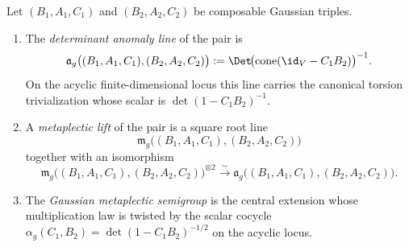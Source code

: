 \begin{definition}
\label{def:frontier-determinant-anomaly-line}
Let $(B_1,A_1,C_1)$ and $(B_2,A_2,C_2)$ be composable Gaussian triples.
\begin{enumerate}[label=\textup{(\roman*)}]
\item The \emph{determinant anomaly line} of the pair is
 \begin{equation}\label{eq:frontier-determinant-anomaly-line}
 \mathfrak a_g\bigl((B_1,A_1,C_1),(B_2,A_2,C_2)\bigr)
 :=
 \Det\!\bigl(\operatorname{cone}(\id_V-C_1B_2)\bigr)^{-1}.
 \end{equation}
 On the acyclic finite-dimensional locus this line carries the canonical
 torsion trivialization whose scalar is $\det(1-C_1B_2)^{-1}$.
\item A \emph{metaplectic lift} of the pair is a square root line
 \begin{equation}\label{eq:frontier-metaplectic-lift-line}
 \mathfrak m_g\bigl((B_1,A_1,C_1),(B_2,A_2,C_2)\bigr)
 \end{equation}
 together with an isomorphism
 \begin{equation}\label{eq:frontier-metaplectic-square-root}
 \mathfrak m_g\bigl((B_1,A_1,C_1),(B_2,A_2,C_2)\bigr)^{\otimes 2}
 \xrightarrow{\sim}
 \mathfrak a_g\bigl((B_1,A_1,C_1),(B_2,A_2,C_2)\bigr).
 \end{equation}
\item The \emph{Gaussian metaplectic semigroup} is the central extension whose
 multiplication law is twisted by the scalar cocycle
 $\alpha_g(C_1,B_2)=\det(1-C_1B_2)^{-1/2}$ on the acyclic locus.
\end{enumerate}
\end{definition}

